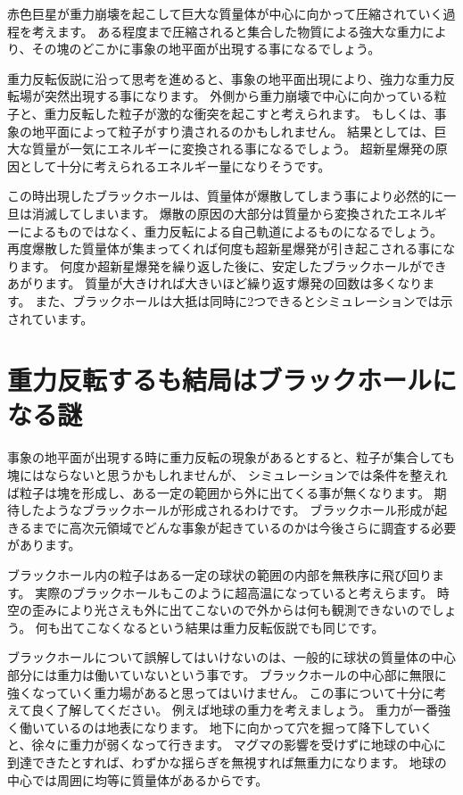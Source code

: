\documentclass[a4paper,12pt,notitlepage]{jsreport}
\begin{document}
赤色巨星が重力崩壊を起こして巨大な質量体が中心に向かって圧縮されていく過程を考えます。
ある程度まで圧縮されると集合した物質による強大な重力により、その塊のどこかに事象の地平面が出現する事になるでしょう。

重力反転仮説に沿って思考を進めると、事象の地平面出現により、強力な重力反転場が突然出現する事になります。
外側から重力崩壊で中心に向かっている粒子と、重力反転した粒子が激的な衝突を起こすと考えられます。
もしくは、事象の地平面によって粒子がすり潰されるのかもしれません。
結果としては、巨大な質量が一気にエネルギーに変換される事になるでしょう。
超新星爆発の原因として十分に考えられるエネルギー量になりそうです。

この時出現したブラックホールは、質量体が爆散してしまう事により必然的に一旦は消滅してしまいます。
爆散の原因の大部分は質量から変換されたエネルギーによるものではなく、重力反転による自己軌道によるものになるでしょう。
再度爆散した質量体が集まってくれば何度も超新星爆発が引き起こされる事になります。
何度か超新星爆発を繰り返した後に、安定したブラックホールができあがります。
質量が大きければ大きいほど繰り返す爆発の回数は多くなります。
また、ブラックホールは大抵は同時に2つできるとシミュレーションでは示されています。

\section{重力反転するも結局はブラックホールになる謎}

事象の地平面が出現する時に重力反転の現象があるとすると、粒子が集合しても塊にはならないと思うかもしれませんが、
シミュレーションでは条件を整えれば粒子は塊を形成し、ある一定の範囲から外に出てくる事が無くなります。
期待したようなブラックホールが形成されるわけです。
ブラックホール形成が起きるまでに高次元領域でどんな事象が起きているのかは今後さらに調査する必要があります。

ブラックホール内の粒子はある一定の球状の範囲の内部を無秩序に飛び回ります。
実際のブラックホールもこのように超高温になっていると考えらます。
時空の歪みにより光さえも外に出てこないので外からは何も観測できないのでしょう。
何も出てこなくなるという結果は重力反転仮説でも同じです。

ブラックホールについて誤解してはいけないのは、一般的に球状の質量体の中心部分には重力は働いていないという事です。
ブラックホールの中心部に無限に強くなっていく重力場があると思ってはいけません。
この事について十分に考えて良く了解してください。
例えば地球の重力を考えましょう。
重力が一番強く働いているのは地表になります。
地下に向かって穴を掘って降下していくと、徐々に重力が弱くなって行きます。
マグマの影響を受けずに地球の中心に到達できたとすれば、わずかな揺らぎを無視すれば無重力になります。
地球の中心では周囲に均等に質量体があるからです。
\end{document}
